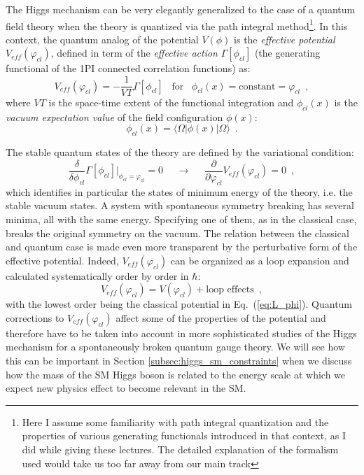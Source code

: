 \documentclass[prd,preprint,aps,floats,superscriptaddress,floatfix,nofootinbib]{revtex4}
\begin{document}
The Higgs mechanism can be very elegantly generalized to the case of a
quantum field theory when the theory is quantized via the path
integral method\footnote{Here I assume some familiarity with path
integral quantization and the properties of various generating
functionals introduced in that context, as I did while giving these
lectures. The detailed explanation of the formalism used would take us
too far away from our main track}. In this context, the quantum analog
of the potential $V(\phi)$ is the
\emph{effective potential} $V_{eff}(\varphi_{cl})$, defined in term of
the \emph{effective action} $\Gamma[\phi_{cl}]$ (the generating
functional of the 1PI connected correlation functions) as:
\begin{equation}
\label{eq:v_eff}
V_{eff}(\varphi_{cl})=-\frac{1}{VT}\Gamma[\phi_{cl}]\,\,\,\,\,\mbox{for}
\,\,\,\,\,\phi_{cl}(x)=\mbox{constant}=\varphi_{cl}\,\,\,,
\end{equation}
where $VT$ is the space-time extent of the functional integration and
$\phi_{cl}(x)$ is the \emph{vacuum expectation value} of the field
configuration $\phi(x)$:
\begin{equation}
\label{eq:phi_cl}
\phi_{cl}(x)=\langle\Omega| \phi(x)|\Omega\rangle\,\,\,.
\end{equation}

The stable quantum states of the theory are defined by the variational
condition:
\begin{equation}
\label{eq:delta_v_eff}
\frac{\delta}{\delta\phi_{cl}}\Gamma[\phi_{cl}]\bigg|_{\phi_{cl}=\varphi_{cl}}=0
\,\,\,\,\,\,\,\,\longrightarrow\,\,\,\,\,\,\,\,
\frac{\partial}{\partial\varphi_{cl}}V_{eff}(\varphi_{cl})=0\,\,\,,
\end{equation}
which identifies in particular the states of minimum energy of the
theory, i.e. the stable vacuum states. A system with spontaneous
symmetry breaking has several minima, all with the same
energy. Specifying one of them, as in the classical case, breaks
the original symmetry on the vacuum. The relation between the
classical and quantum case is made even more transparent by the
perturbative form of the effective potential. Indeed,
$V_{eff}(\varphi_{cl})$ can be organized as a loop expansion and
calculated systematically order by order in $\hbar$:
\begin{equation}
\label{eq:veff_exp}
V_{eff}(\varphi_{cl})=V(\varphi_{cl})+\mbox{loop effects}\,\,\,,
\end{equation}
with the lowest order being the classical potential in
Eq.~(\ref{eq:L_phi}). Quantum corrections to $V_{eff}(\varphi_{cl})$
affect some of the properties of the potential and therefore
have to be taken into account in more sophisticated studies of the
Higgs mechanism for a spontaneously broken quantum gauge theory.  We
will see how this can be important in Section 
\ref{subsec:higgs_sm_constraints} when
we discuss how the mass of the SM Higgs boson is related to the
energy scale at which we expect new physics effect to become relevant
in the SM.
\end{document}
